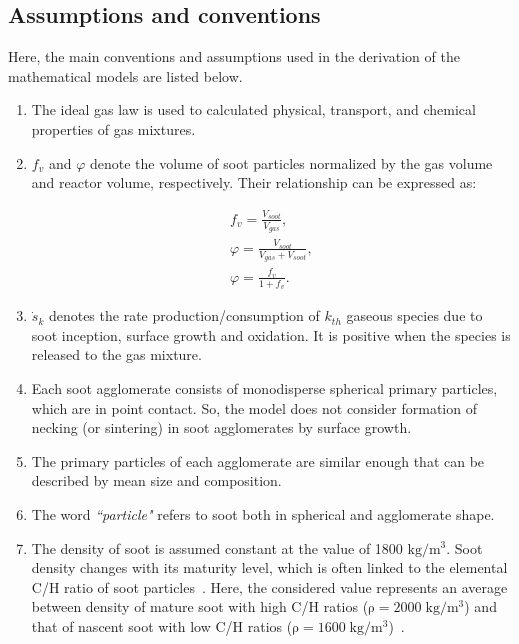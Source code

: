 \subsection{Assumptions and conventions}
Here, the main conventions and assumptions used in the derivation of the mathematical models are listed below.

\begin{enumerate}
\item The ideal gas law is used to calculated physical, transport, and chemical properties of gas mixtures.

\item $f_v$ and $\varphi$ denote the volume of soot particles normalized by the gas volume and reactor volume, respectively. Their relationship can be expressed as:

\begin{equation}
	\begin{split}
		f_v = \frac{V_{soot}}{V_{gas}}, \\
		\varphi = \frac{V_{soot}}{V_{gas} + V_{soot}}, \\
		\varphi = \frac{f_v}{1 + f_v}
		\label{eqn:dp_min}.
	\end{split}
\end{equation}

\item ${\dot{s}_k}$ denotes the rate production/consumption of $k_{th}$ gaseous species due to soot inception, surface growth and oxidation. It is positive when the species is released to the gas mixture.

\item Each soot agglomerate consists of monodisperse spherical primary particles, which are in point contact. So, the model does not consider formation of necking (or sintering) in soot agglomerates by surface growth.

\item The primary particles of each agglomerate are similar enough that can be described by mean size and composition.

\item The word \textit{``particle"} refers to soot both in spherical and agglomerate shape. 

\item The density of soot is assumed constant at the value of 1800 $\mathrm{kg/m^3}$. Soot density changes with its maturity level, which is often linked to the elemental C/H ratio of soot particles~\citep{michelsen2021effects}. Here, the considered value represents an average between density of mature soot with high C/H ratios ($\mathrm{\rho=2000\;kg/m^3}$) and that of nascent soot with low C/H ratios ($\mathrm{\rho=1600\;kg/m^3}$)~\citep{jensen2007measurement, michelsen2021effects}.


\end{enumerate}
